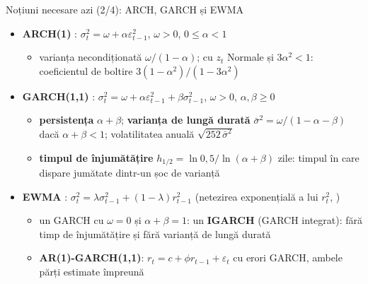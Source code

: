 \begin{frame}{Noțiuni necesare azi (2/4): ARCH, GARCH și EWMA}
\itemsize{\small}
\begin{itemize}
    \item \textbf{ARCH(1)} : $\sigma_t^2 = \omega + \alpha\varepsilon_{t-1}^2$, $\omega > 0$, $0 \le \alpha < 1$
    \begin{itemize}
        \item varianța necondiționată $\omega/(1 - \alpha)$; cu $z_t$ Normale și $3\alpha^2 < 1$: coeficientul de boltire $3(1 - \alpha^2)/(1 - 3\alpha^2)$
    \end{itemize}
    \item \textbf{GARCH(1,1)} : $\sigma_t^2 = \omega + \alpha\varepsilon_{t-1}^2 + \beta\sigma_{t-1}^2$, $\omega > 0$, $\alpha, \beta \ge 0$
    \begin{itemize}
        \item \textbf{persistența} $\alpha + \beta$; \textbf{varianța de lungă durată} $\bar\sigma^2 = \omega/(1 - \alpha - \beta)$ dacă $\alpha + \beta < 1$; volatilitatea anuală $\sqrt{252\,\bar\sigma^2}$
        \item \textbf{timpul de înjumătățire} $h_{1/2} = \ln 0{,}5/\ln(\alpha + \beta)$ zile: timpul în care dispare jumătate dintr-un șoc de varianță
    \end{itemize}
    \item \textbf{EWMA} : $\sigma_t^2 = \lambda\sigma_{t-1}^2 + (1 - \lambda)r_{t-1}^2$ (netezirea exponențială a lui $r_t^2$, )
    \begin{itemize}
        \item un GARCH cu $\omega = 0$ și $\alpha + \beta = 1$: un \textbf{IGARCH} (GARCH integrat): fără timp de înjumătățire și fără varianță de lungă durată
        \item \textbf{AR(1)-GARCH(1,1)}: $r_t = c + \phi r_{t-1} + \varepsilon_t$ cu erori GARCH, ambele părți estimate împreună
    \end{itemize}
\end{itemize}
\end{frame}

